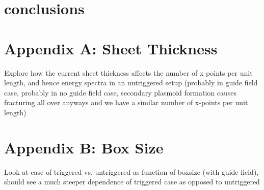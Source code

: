\documentclass[iop,twocolappendix]{emulateapj}
\begin{document}
\section{conclusions}
 

\section{Appendix A: Sheet Thickness}\label{thickness_app}
Explore how the current sheet thickness affects the number of x-points per unit length, and hence energy spectra in an untriggered setup (probably in guide field case, probably in no guide field case, secondary plasmoid formation causes fracturing all over anyways and we have a similar number of x-points per unit length)
\section{Appendix B: Box Size}\label{box_size}
Look at case of triggered vs. untriggered as function of boxsize (with guide field), should see a much steeper dependence of triggered case as opposed to untriggered

\FloatBarrier



\end{document}
